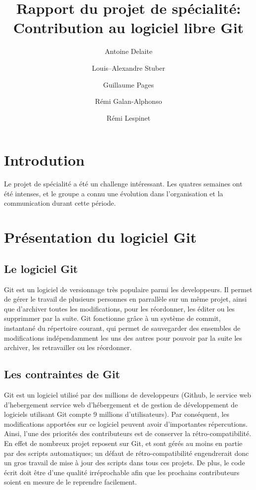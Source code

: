 \documentclass[a4paper, 12pt]{article}
\title{Rapport du projet de spécialité:\\ Contribution au logiciel libre Git}
\author{Antoine Delaite \and Louis--Alexandre Stuber \and Guillaume Pages \and Rémi Galan-Alphonso \and Rémi Lespinet}
\date{}
\begin{document}
\maketitle

\section{Introdution}

Le projet de spécialité a été un challenge intéressant. Les quatres semaines ont été intenses, et le groupe a connu une évolution dans l'organisation et la communication durant cette période. 

\section{Présentation du logiciel Git}

\subsection{Le logiciel Git}

Git est un logiciel de versionnage très populaire parmi les developpeurs. Il permet de gérer le travail de plusieurs personnes en parrallèle sur un même projet, ainsi que d'archiver toutes les modifications, pour les réordonner, les éditer ou les supprimmer par la suite.
Git fonctionne grâce à un système de commit, instantané du répertoire courant, qui permet de sauvegarder des ensembles de modifications indépendamment les uns des autres pour pouvoir par la suite les archiver, les retravailler ou les réordonner.

\subsection{Les contraintes de Git}

Git est un logiciel utilisé par des millions de developpeurs (Github, le service web d'hebergement service web d'hébergement et de gestion de développement de logiciels utilisant Git compte 9 millions d'utilisateurs).
Par conséquent, les modifications apportées sur ce logiciel peuvent avoir d'importantes répercutions.
Ainsi, l'une des priorités des contributeurs est de conserver la rétro-compatibilité.
En effet de nombreux projet reposent sur Git, et sont gérés au moins en partie par des scripts automatiques; un défaut de rétro-compatibilité engendrerait donc un gros travail de mise à jour des scripts dans tous ces projets. 
De plus, le code écrit doit être d'une qualité irréprochable afin que les prochains contributeurs soient en mesure de le reprendre facilement.
\end{document}
